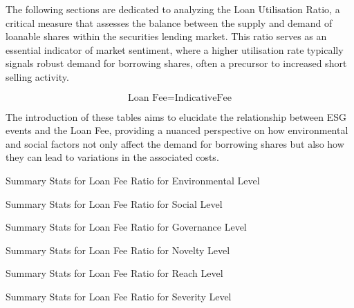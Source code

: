 The following sections are dedicated to analyzing the Loan Utilisation Ratio, a critical measure that assesses the balance between the supply and demand of loanable shares within the securities lending market. This ratio serves as an essential indicator of market sentiment, where a higher utilisation rate typically signals robust demand for borrowing shares, often a precursor to increased short selling activity.

 \begin{equation}
	\text{Loan Fee} = \text{IndicativeFee}
	\label{eq:Loan_Fee}
\end{equation}

The introduction of these tables aims to elucidate the relationship between ESG events and the Loan Fee, providing a nuanced perspective on how environmental and social factors not only affect the demand for borrowing shares but also how they can lead to variations in the associated costs.

\begin{table}[H]
\caption{Summary Stats for Loan Fee Ratio for Environmental Level}
\centering

\label{table:loan_fee_environment.tex}
\end{table}

\begin{table}[H]
\caption{Summary Stats for Loan Fee Ratio for Social Level}
\centering

\label{table:loan_fee_social.tex}
\end{table}

\begin{table}[H]
\caption{Summary Stats for Loan Fee Ratio for Governance Level}
\centering

\label{table:loan_fee_governance.tex}
\end{table}


\begin{table}[H]
\caption{Summary Stats for Loan Fee Ratio for Novelty Level}
\centering

\label{table:loan_fee_novelty.tex}
\end{table}

\begin{table}[H]
\caption{Summary Stats for Loan Fee Ratio for Reach Level}
\centering

\label{table:loan_fee_reach.tex}
\end{table}

\begin{table}[H]
\caption{Summary Stats for Loan Fee Ratio for Severity Level}
\centering

\label{table:loan_fee_severity.tex}
\end{table}




